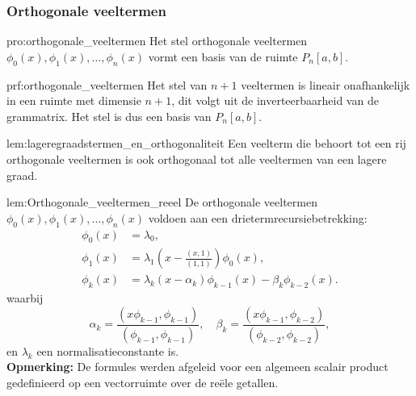 \subsubsection{Orthogonale veeltermen}

\vspace{0.5cm}

\begin{pro}{pro:orthogonale_veeltermen}
    Het stel orthogonale veeltermen $\phi_0(x), \phi_1(x), \ldots, \phi_n(x)$ vormt een basis van de ruimte $P_n[a,b]$.
\end{pro}

\begin{prf}{prf:orthogonale_veeltermen}
    Het stel van $n+1$ veeltermen is lineair onafhankelijk in een ruimte met dimensie $n+1$, dit volgt uit de inverteerbaarheid van de grammatrix. Het stel is dus een basis van $P_n[a,b]$.
\end{prf}

\begin{lem}{lem:lageregraadstermen_en_orthogonaliteit}   
    Een veelterm die behoort tot een rij orthogonale veeltermen is ook orthogonaal tot alle veeltermen van een lagere graad.
\end{lem}

\newpage

\begin{lem}{lem:Orthogonale_veeltermen_reeel}   
    De orthogonale veeltermen $\phi_0(x), \phi_1(x), \ldots, \phi_n(x)$ voldoen aan een drietermrecursiebetrekking:
    \begin{align*}
        \phi_0(x) &= \lambda_0, \\
        \phi_1(x) &= \lambda_1\left(x - \frac{(x,1)}{(1,1)}\right)\phi_0(x), \\
        \phi_k(x) &= \lambda_k\left(x - \alpha_k\right)\phi_{k-1}(x) - \beta_k\phi_{k-2}(x).
    \end{align*}
    waarbij
    \begin{equation*}
        \alpha_k = \frac{(x\phi_{k-1},\phi_{k-1})}{(\phi_{k-1},\phi_{k-1})}, \quad
        \beta_k = \frac{(x\phi_{k-1},\phi_{k-2})}{(\phi_{k-2},\phi_{k-2})},
    \end{equation*}
    en $\lambda_k$ een normalisatieconstante is. \\

    \textbf{Opmerking:} De formules werden afgeleid voor een algemeen scalair product gedefinieerd op een vectorruimte over de reële getallen.
\end{lem}

